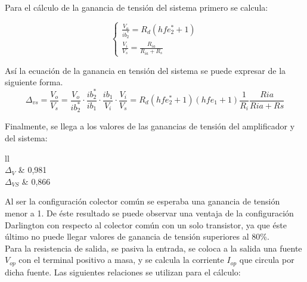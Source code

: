 Para el cálculo de la ganancia de tensión del sistema primero se calcula:

	\begin{equation}
		\begin{cases}	
		\frac{V_{o}}{ib_{2}^{*}}=R_{d}(hfe_{2}^{*}+1) \\
		\frac{V_{i}}{V_{s}}=\frac{R_{ia}}{R_{ia}+R_{s}}
		\end{cases}
		\label{mod_inc_ecs}
	\end{equation}

Así la ecuación de la ganancia en tensión del sistema se puede expresar de la siguiente forma. \\

	\begin{equation}	
		\Delta _{vs}=\frac{V_{o}}{V_{s}}=\frac{V_{o}}{ib_{2}^{*}}\cdot\frac{ib_{2}^{*}}{ib_{1}}\cdot\frac{ib_{1}}{V_{i}}\cdot\frac{V_{i}}{V_{s}}=R_{d}(hfe_{2}^{*}+1)(hfe_{1}+1)\frac{1}{R_{i}}\frac{Ria}{Ria+Rs}
		\label{mod_inc_avs}
	\end{equation}

Finalmente, se llega a los valores de las ganancias de tensión del amplificador y del sistema:

\begin{table}[H]
\centering
\begin{tabular}{ll}	
 \\ \hline
$\Delta_{V}$                                       & 0,981                                     \\
$\Delta_{VS}$                                      & 0,866                                    
\end{tabular}
\end{table}

Al ser la configuración colector común se esperaba una ganancia de tensión menor a 1. De éste resultado se puede observar una ventaja de la configuración Darlington con respecto al colector común con un solo transistor, ya que éste último no puede llegar valores de ganancia de tensión superiores al 80\%.\\


Para la resistencia de salida, se pasiva la entrada, se coloca a la salida una fuente $V_{op}$ con el terminal positivo a masa, y se calcula la corriente $I_{op}$ que circula por dicha fuente. Las siguientes relaciones se utilizan para el cálculo:

